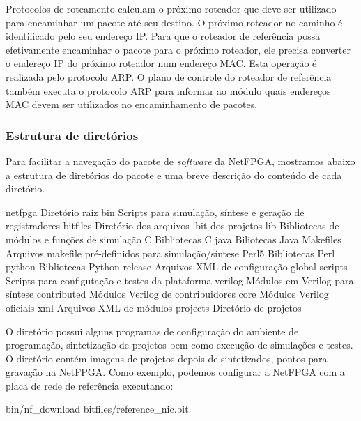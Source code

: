 Protocolos de roteamento calculam o próximo roteador que deve ser
utilizado para encaminhar um pacote até seu destino.  O próximo
roteador no caminho é identificado pelo seu endereço IP.  Para que o
roteador de referência possa efetivamente encaminhar o pacote para o
próximo roteador, ele precisa converter o endereço IP do próximo
roteador num endereço MAC.  Esta operação é realizada pelo protocolo
ARP.  O plano de controle do roteador de referência também executa o
protocolo ARP para informar ao módulo 
quais endereços MAC devem ser utilizados no encaminhamento de
pacotes.

\subsubsection{Estrutura de diretórios}

Para facilitar a navegação do pacote de \emph{software} da NetFPGA,
mostramos abaixo a estrutura de diretórios do pacote e uma breve
descrição do conteúdo de cada diretório.

\begin{verbnobox}[\footnotesize]
netfpga                {Diretório raiz}
   bin                 {Scripts para simulação, síntese e geração de registradores}
   bitfiles            {Diretório dos arquivos .bit dos projetos}
   lib                 {Bibliotecas de módulos e funções de simulação}
      C                {Bibliotecas C}
      java             {Biliotecas Java}
      Makefiles        {Arquivos makefile pré-definidos para simulação/síntese}
      Perl5            {Bibliotecas Perl}
      python           {Bibliotecas Python}
      release          {Arquivos XML de configuração global}
      scripts          {Scripts para configutação e testes da plataforma}
      verilog          {Módulos em Verilog para síntese}
         contributed   {Módulos Verilog de contribuidores}
         core          {Módulos Verilog oficiais}
      xml              {Arquivos XML de módulos}
   projects            {Diretório de projetos}
\end{verbnobox}

O diretório  possui alguns programas de configuração do
ambiente de programação, sintetização de projetos bem como execução
de simulações e testes.  O diretório  contém imagens
de projetos depois de sintetizados, pontos para gravação na NetFPGA.
Como exemplo, podemos configurar a NetFPGA com a placa de rede de
referência executando:

\begin{verbnobox}
bin/nf_download bitfiles/reference_nic.bit
\end{verbnobox}

